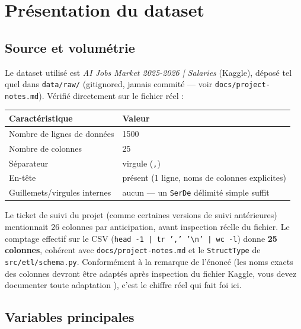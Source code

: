 \chapter{Présentation du dataset}

\section{Source et volumétrie}

Le dataset utilisé est \emph{AI Jobs Market 2025-2026 | Salaries}
(Kaggle), déposé tel quel dans \texttt{data/raw/} (gitignored, jamais
commité — voir \texttt{docs/project-notes.md}). Vérifié directement sur le fichier
réel :

\begin{center}
\begin{tabular}{ll}
\toprule
Caractéristique & Valeur \\
\midrule
Nombre de lignes de données & 1500 \\
Nombre de colonnes & 25 \\
Séparateur & virgule (\texttt{,}) \\
En-tête & présent (1 ligne, noms de colonnes explicites) \\
Guillemets/virgules internes & aucun — un \texttt{SerDe} délimité simple suffit \\
\bottomrule
\end{tabular}
\end{center}

\begin{constat}
Le ticket de suivi du projet (comme certaines versions de suivi antérieures)
mentionnait 26 colonnes par anticipation, avant inspection réelle du
fichier. Le comptage effectif sur le CSV (\texttt{head -1 | tr ',' '\textbackslash n' | wc -l})
donne \textbf{25 colonnes}, cohérent avec \texttt{docs/project-notes.md} et le
\texttt{StructType} de \texttt{src/etl/schema.py}. Conformément à la
remarque de l'énoncé (\og les noms exacts des colonnes devront être
adaptés après inspection du fichier Kaggle, vous devez documenter toute
adaptation \fg{}), c'est le chiffre réel qui fait foi ici.
\end{constat}

\section{Variables principales}

